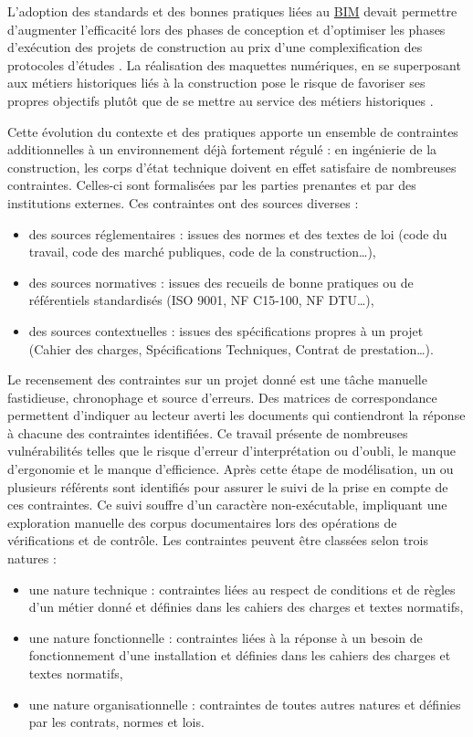 \documentclass[a4paper,12pt]{article}
\begin{document}
L'adoption des standards et des bonnes pratiques liées au \protect\hyperlink{gls-1}{\label{gls-1-use-2}BIM} devait permettre d'augmenter l'efficacité lors des phases de conception et d'optimiser les phases d'exécution des projets de construction au prix d'une complexification des protocoles d'études \autocite{lindbladBIMImplementationOrganisational2015}. La réalisation des maquettes numériques, en se superposant aux métiers historiques liés à la construction pose le risque de favoriser ses propres objectifs plutôt que de se mettre au service des métiers historiques \autocite{lourauAnalyseInstitutionnelleQuestion1973}.

Cette évolution du contexte et des pratiques apporte un ensemble de contraintes additionnelles à un environnement déjà fortement régulé : en ingénierie de la construction, les corps d'état technique doivent en effet satisfaire de nombreuses contraintes. Celles-ci sont formalisées par les parties prenantes et par des institutions externes. Ces contraintes ont des sources diverses \autocite{artokiviniemiPREMISSRequirementsManagement2004} :
\begin{itemize}
\item des sources réglementaires : issues des normes et des textes de loi (code du travail, code des marché publiques, code de la construction\ldots{}),
\item des sources normatives : issues des recueils de bonne pratiques ou de référentiels standardisés (ISO 9001, NF C15-100, NF DTU\ldots{}),
\item des sources contextuelles : issues des spécifications propres à un projet (Cahier des charges, Spécifications Techniques, Contrat de prestation\ldots{}).
\end{itemize}

Le recensement des contraintes sur un projet donné est une tâche manuelle fastidieuse, chronophage et source d'erreurs. Des matrices de correspondance permettent d'indiquer au lecteur averti les documents qui contiendront la réponse à chacune des contraintes identifiées. Ce travail présente de nombreuses vulnérabilités telles que le risque d'erreur d'interprétation ou d'oubli, le manque d'ergonomie et le manque d'efficience. Après cette étape de modélisation, un ou plusieurs référents sont identifiés pour assurer le suivi de la prise en compte de ces contraintes. Ce suivi souffre d'un caractère non-exécutable, impliquant une exploration manuelle des corpus documentaires lors des opérations de vérifications et de contrôle. Les contraintes peuvent être classées selon trois natures :
\begin{itemize}
\item une nature technique : contraintes liées au respect de conditions et de règles d'un métier donné et définies dans les cahiers des charges et textes normatifs,
\item une nature fonctionnelle : contraintes liées à la réponse à un besoin de fonctionnement d'une installation et définies dans les cahiers des charges et textes normatifs,
\item une nature organisationnelle : contraintes de toutes autres natures et définies par les contrats, normes et lois.
\end{itemize}
\end{document}
